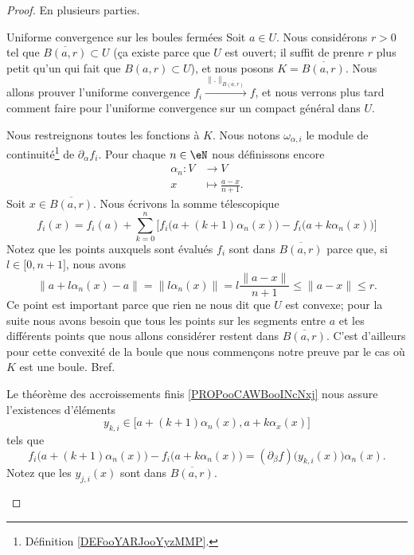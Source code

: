 \begin{proof}
    En plusieurs parties.
    \begin{subproof}
    \item[Uniforme convergence sur les boules fermées]
    Soit \( a\in U\). Nous considérons \( r>0\) tel que \( \overline{ B(a,r) }\subset U\) (ça existe parce que \( U\) est ouvert; il suffit de prenre \( r\) plus petit qu'un qui fait que \( B(a,r)\subset U\)), et nous posons \( K=\overline{ B(a,r) }\). Nous allons prouver l'uniforme convergence \( f_i\stackrel{\|  .\|_{\overline{ B(a,r) }}}{\longrightarrow}f\), et nous verrons plus tard comment faire pour l'uniforme convergence sur un compact général dans \( U\).

    Nous restreignons toutes les fonctions à \( K\). Nous notons \( \omega_{\alpha, i}\) le module de continuité\footnote{Définition \ref{DEFooYARJooYyzMMP}.} de \( \partial_{\alpha}f_i\). Pour chaque \( n\in \eN\) nous définissons encore
    \begin{equation}
        \begin{aligned}
            \alpha_n\colon V&\to V \\
            x&\mapsto \frac{ a-x }{ n+1 }. 
        \end{aligned}
    \end{equation}
    Soit \( x\in \overline{ B(a,r) }\). Nous écrivons la somme télescopique
    \begin{equation}        \label{EQooMXVLooXFceGH}
        f_i(x)=f_i(a)+\sum_{k=0}^n\big[ f_i\big(a+(k+1)\alpha_n(x)\big)-f_i\big(a+k\alpha_n(x)\big) \big]
    \end{equation}
    Notez que les points auxquels sont évalués \( f_i\) sont dans \( \overline{ B(a,r) }\) parce que, si \( l\in \mathopen[ 0 , n+1 \mathclose]\), nous avons
    \begin{equation}
            \| a+l\alpha_n(x)-a \|=\| l\alpha_n(x) \|
            =l\frac{ \| a-x \| }{ n+1 }
            \leq\| a-x \|
            \leq r.
    \end{equation}
    Ce point est important parce que rien ne nous dit que \(U\) est convexe; pour la suite nous avons besoin que tous les points sur les segments entre \( a\) et les différents points que nous allons considérer restent dans \( \overline{ B(a,r) }\). C'est d'ailleurs pour cette convexité de la boule que nous commençons notre preuve par le cas où \( K\) est une boule. Bref.

    Le théorème des accroissements finis \ref{PROPooCAWBooINcNxj} nous assure l'existences d'éléments
    \begin{equation}
        y_{k,i}\in \mathopen\big[ a+(k+1)\alpha_n(x)   , a+k\alpha_x(x) \mathclose\big]
    \end{equation}
    tels que
    \begin{equation}
        f_i\big( a+(k+1)\alpha_n(x) \big)-f_i\big( a+k\alpha_n(x) \big)=(\partial_{\beta}f)\big( y_{k,i}(x) \big)\alpha_n(x).
    \end{equation}
    Notez que les \( y_{j,i}(x)\) sont dans \( \overline{ B(a,r) }\).
    

\end{subproof}
\end{proof}
